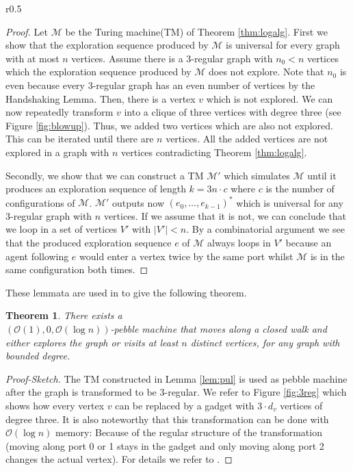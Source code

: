 \documentclass[oneside]{scrartcl}
\newtheorem{thm}{Theorem}
\begin{document}
\begin{wrapfigure}{r}{0.5\textwidth}
  \flushright{\resizebox{0.4\textwidth}{!}{}}
  \caption{Illustration how to transform any graph to a 3-regular graph.}
  \label{fig:3reg}
  \vspace{-0.5cm}
\end{wrapfigure}
\begin{proof}
  Let $\mathcal{M}$ be the Turing machine(TM) of Theorem \ref{thm:logalg}.
  First we show that the exploration sequence produced by $\mathcal{M}$ is
  universal for every graph with at most $n$ vertices. Assume there
  is a 3-regular graph with $n_{0} < n$ vertices which the exploration
  sequence produced by $\mathcal{M}$ does not explore. Note that $n_{0}$ is
  even because every 3-regular graph has an even number of vertices by the
  Handshaking Lemma. Then, there is a vertex $v$ which is not explored. We can
  now repeatedly transform $v$ into a clique of three vertices with degree
  three (see Figure \ref{fig:blowup}).
  Thus, we added two vertices which are also not explored. This can be iterated
  until there are $n$ vertices. All the added vertices are not explored in a
  graph with $n$ vertices contradicting Theorem \ref{thm:logalg}.

  Secondly, we show that we can construct a TM $\mathcal{M}'$ which simulates
  $\mathcal{M}$ until it produces an exploration sequence of length
  $k = 3n\cdot c$ where $c$ is the number of configurations of $\mathcal{M}$.
  $\mathcal{M}'$ outputs now $(e_{0},\dots,e_{k-1})^{\ast}$ which is universal
  for any 3-regular graph with $n$ vertices. If we assume that it is not, we
  can conclude that we loop in a set of vertices $V'$ with $|V'|<n$. By a
  combinatorial argument we see that the produced exploration sequence $e$
  of $\mathcal{M}$ always loops in $V'$ because an agent following
  $e$ would enter a vertex twice by the same port whilst $\mathcal{M}$
  is in the same configuration both times.
\end{proof}
These lemmata are used in \cite{pebbles} to give the following theorem.
\begin{thm}
  \label{thm:pebblewalk}
  There exists a\\ $(\mathcal{O}(1),0,\mathcal{O}(\log n))$-pebble machine
  that moves along a closed walk and either explores the graph or visits
  at least $n$ distinct vertices, for any graph with bounded degree.
\end{thm}
\begin{proof}[Proof-Sketch]
  The TM constructed in Lemma \ref{lem:pul} is used as pebble
  machine after the graph is transformed to be 3-regular.
  We refer to Figure \ref{fig:3reg} which shows how every vertex $v$
  can be replaced by a gadget with $3\cdot d_{v}$ vertices of degree three. It
  is also noteworthy that this transformation can be done with
  $\mathcal{O}(\log n)$ memory: Because of the regular structure of the
  transformation (moving along port 0 or 1 stays in the gadget and only
  moving along port 2 changes the actual vertex). For details we refer to
  \cite{pebbles}.
\end{proof}
\end{document}
